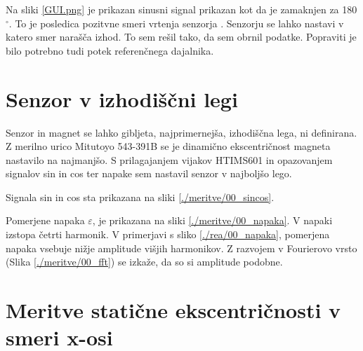 Na sliki  \ref{GUI.png} je prikazan sinusni signal prikazan kot da je zamaknjen za 180$\mathrm{^\circ}$. To je posledica pozitvne smeri vrtenja senzorja \cite{RM44}. Senzorju se lahko nastavi v katero smer narašča izhod. To sem rešil tako, da sem obrnil podatke. Popraviti je bilo potrebno tudi potek referenčnega dajalnika.




\newpage
\section{Senzor v izhodiščni legi}

Senzor in magnet se lahko gibljeta, najprimernejša, izhodiščna lega, ni definirana. Z merilno urico Mitutoyo 543-391B se je dinamično ekscentričnost magneta nastavilo na najmanjšo.
S prilagajanjem vijakov HTIMS601 in opazovanjem signalov sin in cos ter napake sem nastavil senzor v najboljšo lego.

Signala sin in cos sta prikazana na sliki \ref{./meritve/00_sincos}. 



Pomerjene napaka $\varepsilon$, je prikazana na sliki \ref{./meritve/00_napaka}.
V napaki izstopa četrti harmonik.
V primerjavi s sliko \ref{./rea/00_napaka}, pomerjena napaka vsebuje nižje amplitude višjih harmonikov.
Z razvojem v Fourierovo vrsto (Slika \ref{./meritve/00_fft}) se izkaže, da so si amplitude podobne.



\section{Meritve statične ekscentričnosti v smeri x-osi}







